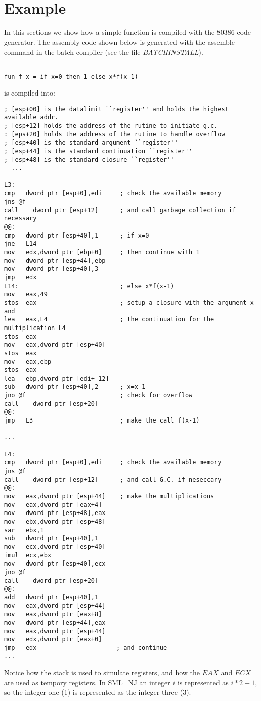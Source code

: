 \section{Example} \label{sec:example}

In this sections we show how a simple function is compiled with the
80386 code generator. The assembly code shown below is generated with
the assemble command in the batch compiler (see the file {\em
BATCHINSTALL\/}).

\begin{verbatim}

fun f x = if x=0 then 1 else x*f(x-1)

\end{verbatim}

is compiled into:

\begin{footnotesize}
\begin{verbatim}
; [esp+00] is the datalimit ``register'' and holds the highest available addr.
; [esp+12] holds the address of the rutine to initiate g.c.
: [eps+20] holds the address of the rutine to handle overflow
; [esp+40] is the standard argument ``register''
; [esp+44] is the standard continuation ``register''
; [esp+48] is the standard closure ``register''
  ...

L3:
cmp   dword ptr [esp+0],edi     ; check the available memory
jns @f
call    dword ptr [esp+12]      ; and call garbage collection if necessary
@@:
cmp   dword ptr [esp+40],1      ; if x=0
jne   L14
mov   edx,dword ptr [ebp+0]     ; then continue with 1
mov   dword ptr [esp+44],ebp
mov   dword ptr [esp+40],3
jmp   edx
L14:                            ; else x*f(x-1)
mov   eax,49
stos  eax                       ; setup a closure with the argument x and
lea   eax,L4                    ; the continuation for the multiplication L4
stos  eax
mov   eax,dword ptr [esp+40]
stos  eax
mov   eax,ebp
stos  eax
lea   ebp,dword ptr [edi+-12]
sub   dword ptr [esp+40],2      ; x=x-1
jno @f                          ; check for overflow
call    dword ptr [esp+20]
@@:
jmp   L3                        ; make the call f(x-1)

...

L4:
cmp   dword ptr [esp+0],edi     ; check the available memory
jns @f
call    dword ptr [esp+12]      ; and call G.C. if neseccary
@@:
mov   eax,dword ptr [esp+44]    ; make the multiplications
mov   eax,dword ptr [eax+4]
mov   dword ptr [esp+48],eax
mov   ebx,dword ptr [esp+48]
sar   ebx,1
sub   dword ptr [esp+40],1
mov   ecx,dword ptr [esp+40]
imul  ecx,ebx
mov   dword ptr [esp+40],ecx
jno @f
call    dword ptr [esp+20]
@@:
add   dword ptr [esp+40],1
mov   eax,dword ptr [esp+44]
mov   eax,dword ptr [eax+8]
mov   dword ptr [esp+44],eax
mov   eax,dword ptr [esp+44]
mov   edx,dword ptr [eax+0]
jmp   edx                      ; and continue
...
\end{verbatim}
\end{footnotesize}

Notice how the stack is used to simulate registers, and how the $EAX$
and $ECX$ are used as tempory registers. In SML\_NJ an integer $i$ is
represented as $i*2+1$, so the integer one (1) is represented as the
integer three (3).





